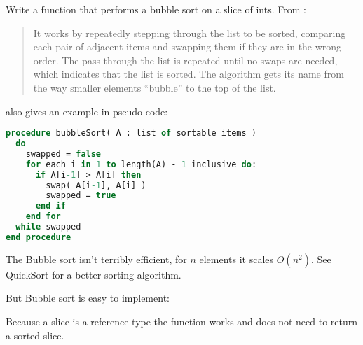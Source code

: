 \begin{Exercise}[title={Bubble sort},difficulty=1]
\label{ex:bubble}
\Question\label{ex:bubble q1} Write a function that performs 
a bubble sort on a slice of ints. From \cite{bubblesort}:
\begin{quote}
It works by repeatedly stepping through the list to be sorted, comparing each
pair of adjacent items and swapping them if they are in the wrong order. The
pass through the list is repeated until no swaps are needed, which indicates
that the list is sorted. The algorithm gets its name from the way smaller
elements ``bubble'' to the top of the list. 
\end{quote}

\cite{bubblesort} also gives an example in pseudo code:
\begin{lstlisting}[language=pascal]
procedure bubbleSort( A : list of sortable items )
  do
    swapped = false
    for each i in 1 to length(A) - 1 inclusive do:
      if A[i-1] > A[i] then
        swap( A[i-1], A[i] )
        swapped = true
      end if
    end for
  while swapped
end procedure
\end{lstlisting}
\end{Exercise}

\begin{Answer}
\Question 
The Bubble sort isn't terribly efficient, for $n$ elements it scales
$O(n^2)$. See QuickSort \cite{quicksort} for a better sorting algorithm.

But Bubble sort is easy to implement:


Because a slice is a reference type the  function works and
does not need to return a sorted slice.
\end{Answer}
